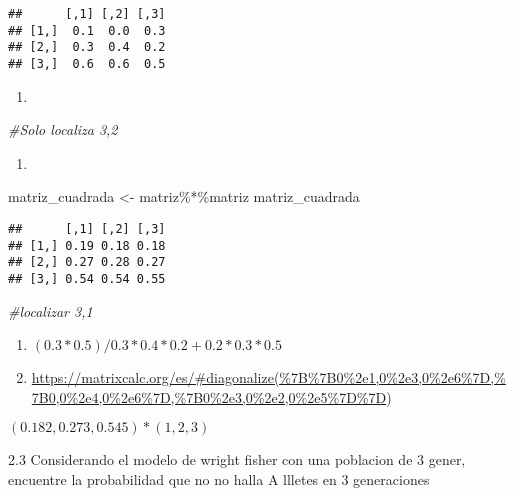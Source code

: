 \documentclass[
]{article}
\newenvironment{Shaded}{\begin{snugshade}}{\end{snugshade}}
\newcommand{\CommentTok}[1]{\textcolor[rgb]{0.56,0.35,0.01}{\textit{#1}}}
\newcommand{\NormalTok}[1]{#1}
\newcommand{\OtherTok}[1]{\textcolor[rgb]{0.56,0.35,0.01}{#1}}
\newcommand{\SpecialCharTok}[1]{\textcolor[rgb]{0.00,0.00,0.00}{#1}}
\providecommand{\tightlist}{%
  \setlength{\itemsep}{0pt}\setlength{\parskip}{0pt}}
\begin{document}
\begin{verbatim}
##      [,1] [,2] [,3]
## [1,]  0.1  0.0  0.3
## [2,]  0.3  0.4  0.2
## [3,]  0.6  0.6  0.5
\end{verbatim}

\begin{enumerate}
\def\labelenumi{\alph{enumi})}
\tightlist
\item
\end{enumerate}

\begin{Shaded}
\begin{Highlighting}[]
\CommentTok{\#Solo localiza 3,2}
\end{Highlighting}
\end{Shaded}

\begin{enumerate}
\def\labelenumi{\alph{enumi})}
\setcounter{enumi}{1}
\tightlist
\item
\end{enumerate}

\begin{Shaded}
\begin{Highlighting}[]
\NormalTok{matriz\_cuadrada }\OtherTok{\textless{}{-}}\NormalTok{ matriz}\SpecialCharTok{\%*\%}\NormalTok{matriz}
\NormalTok{matriz\_cuadrada}
\end{Highlighting}
\end{Shaded}

\begin{verbatim}
##      [,1] [,2] [,3]
## [1,] 0.19 0.18 0.18
## [2,] 0.27 0.28 0.27
## [3,] 0.54 0.54 0.55
\end{verbatim}

\begin{Shaded}
\begin{Highlighting}[]
\CommentTok{\#localizar 3,1}
\end{Highlighting}
\end{Shaded}

\begin{enumerate}
\def\labelenumi{\alph{enumi})}
\setcounter{enumi}{2}
\item
  \((0.3*0.5) / 0.3*0.4*0.2+0.2*0.3*0.5\)
\item
  \url{https://matrixcalc.org/es/\#diagonalize(\%7B\%7B0\%2e1,0\%2e3,0\%2e6\%7D,\%7B0,0\%2e4,0\%2e6\%7D,\%7B0\%2e3,0\%2e2,0\%2e5\%7D\%7D})
\end{enumerate}

\((0.182,0.273,0.545) * (1,2,3)\)

2.3 Considerando el modelo de wright fisher con una poblacion de 3
gener, encuentre la probabilidad que no no halla A llletes en 3
generaciones
\end{document}
